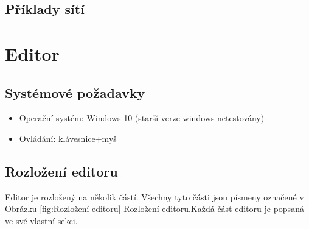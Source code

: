 \documentclass[
  biblatex,
  glossaries,
  index
]{kidiplom}
\begin{document}
\subsection{Příklady sítí}




\clearpage
\section{Editor}
\subsection{Systémové požadavky}
\begin{itemize}
  \item Operační systém: Windows 10 (starší verze windows netestovány)
  \item Ovládání: klávesnice+myš
\end{itemize}

  
\subsection{Rozložení editoru}
Editor je rozložený na několik částí. Všechny tyto části 
jsou písmeny označené v Obrázku \ref{fig:Rozložení editoru} 
Rozložení editoru.Každá část editoru je popsaná ve své vlastní sekci.
\end{document}
